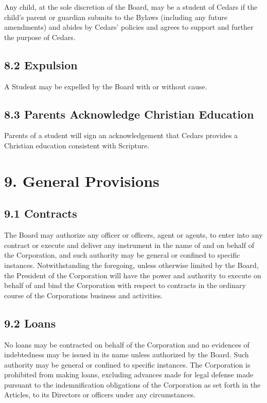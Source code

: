 \documentclass[
]{book}
\begin{document}
Any child, at the sole discretion of the Board, may be a student of Cedars if the child's parent or guardian submits to the Bylaws (including any future amendments) and abides by Cedars' policies and agrees to support and further the purpose of Cedars.

\subsection{8.2 Expulsion}\label{expulsion}

A Student may be expelled by the Board with or without cause.

\subsection{8.3 Parents Acknowledge Christian Education}\label{parents-acknowledge-christian-education}

Parents of a student will sign an acknowledgement that Cedars provides a Christian education consistent with Scripture.

\section{9. General Provisions}\label{general-provisions}

\subsection{9.1 Contracts}\label{contracts}

The Board may authorize any officer or officers, agent or agents, to enter into any contract or execute and deliver any instrument in the name of and on behalf of the Corporation, and such authority may be general or confined to specific instances. Notwithstanding the foregoing, unless otherwise limited by the Board, the President of the Corporation will have the power and authority to execute on behalf of and bind the Corporation with respect to contracts in the ordinary course of the Corporation\textquotesingle s business and activities.

\subsection{9.2 Loans}\label{loans}

No loans may be contracted on behalf of the Corporation and no evidences of indebtedness may be issued in its name unless authorized by the Board. Such authority may be general or confined to specific instances. The Corporation is prohibited from making loans, excluding advances made for legal defense made pursuant to the indemnification obligations of the Corporation as set forth in the Articles, to its Directors or officers under any circumstances.
\end{document}
